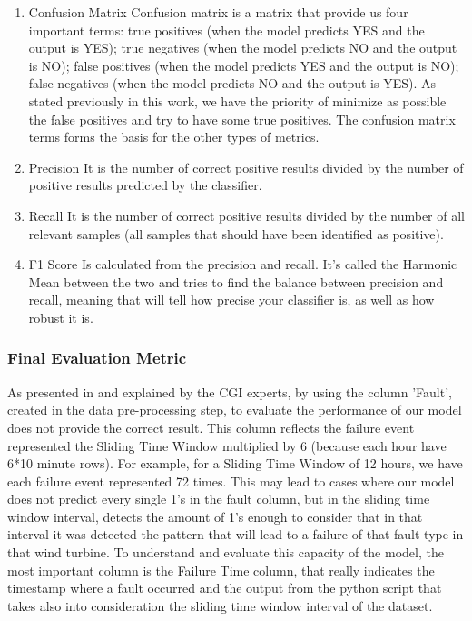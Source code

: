 \begin{enumerate}
    \item{Confusion Matrix}
Confusion matrix is a matrix that provide us four important terms: true positives (when the model predicts YES and the output is YES); true negatives (when the model predicts NO and the output is NO); false positives (when the model predicts YES and the output is NO); false negatives (when the model predicts NO and the output is YES).
As stated previously in this work, we have the priority of minimize as possible the false positives and try to have some true positives.
The confusion matrix terms forms the basis for the other types of metrics.

    \item{Precision}
It is the number of correct positive results divided by the number of positive results predicted by the classifier.


    \item{Recall}
It is the number of correct positive results divided by the number of all relevant samples (all samples that should have been identified as positive).


    \item{F1 Score}
Is calculated from the precision and recall. It's called the Harmonic Mean between the two and tries to find the balance between precision and recall, meaning that will tell how precise your classifier is, as well as how robust it is.
    
    
\end{enumerate}

\subsubsection{Final Evaluation Metric}
As presented in \cite{MED_1} and explained by the CGI experts, by using the column 'Fault', created in the data pre-processing step, to evaluate the performance of our model does not provide the correct result. This column reflects the failure event represented the Sliding Time Window multiplied by 6 (because each hour have 6*10 minute rows). For example, for a Sliding Time Window of 12 hours, we have each failure event represented 72 times. This may lead to cases where our model does not predict every single 1's in the fault column, but in the sliding time window interval, detects the amount of 1's enough to consider that in that interval it was detected the pattern that will lead to a failure of that fault type in that wind turbine. To understand and evaluate this capacity of the model, the most important column is the Failure Time column, that really indicates the timestamp where a fault occurred and the output from the python script that takes also into consideration the sliding time window interval of the dataset.

